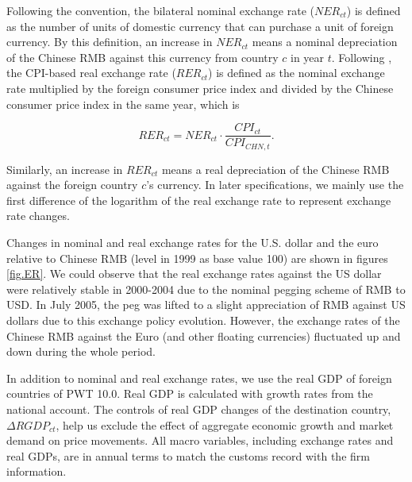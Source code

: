 Following the convention, the bilateral nominal exchange rate ($NER_{ct}$) is defined as the number of units of domestic currency that can purchase a unit of foreign currency. By this definition, an increase in $NER_{ct}$ means a nominal depreciation of the Chinese RMB against this currency from country $c$ in year $t$. Following \cite{lmx2015}, the CPI-based real exchange rate ($RER_{ct}$) is defined as the nominal exchange rate multiplied by the foreign consumer price index and divided by the Chinese consumer price index in the same year, which is

$$
RER_{ct}=NER_{ct} \cdot \frac{CPI_{ct}}{CPI_{CHN,t}}.
$$

Similarly, an increase in $RER_{ct}$ means a real depreciation of the Chinese RMB against the foreign country $c$'s currency. In later specifications, we mainly use the first difference of the logarithm of the real exchange rate to represent exchange rate changes.

Changes in nominal and real exchange rates for the U.S. dollar and the euro relative to Chinese RMB (level in 1999 as base value 100) are shown in figures \ref{fig.ER}. We could observe that the real exchange rates against the US dollar were relatively stable in 2000-2004 due to the nominal pegging scheme of RMB to USD. In July 2005, the peg was lifted to a slight appreciation of RMB against US dollars due to this exchange policy evolution. However, the exchange rates of the Chinese RMB against the Euro (and other floating currencies) fluctuated up and down during the whole period. 

In addition to nominal and real exchange rates, we use the real GDP of foreign countries of PWT 10.0. Real GDP is calculated with growth rates from the national account. The controls of real GDP changes of the destination country, $\Delta RGDP_{ct}$, help us exclude the effect of aggregate economic growth and market demand on price movements. All macro variables, including exchange rates and real GDPs, are in annual terms to match the customs record with the firm information.

